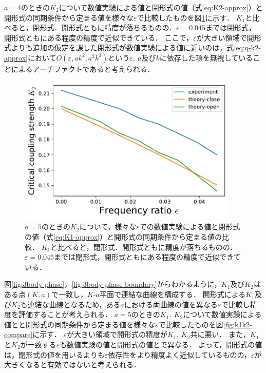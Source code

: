 \documentclass[../main]{subfiles}
\begin{document}
$a=4$のときの$K_2$について数値実験による値と閉形式の値（式\eqref{eq:K2-approx}）と開形式の同期条件から定まる値を様々な$\varepsilon$で比較したものを図\ref{fig:k2-compare}に示す．
$K_1$と比べると，閉形式．開形式ともに精度が落ちるものの．$\varepsilon=0.045$までは閉形式，開形式ともにある程度の精度で近似できている．
ここで，$\varepsilon$が大きい領域で開形式よりも追加の仮定を課した閉形式が数値実験による値に近いのは，式\eqref{eq:q-k2-approx}において$O(\varepsilon,ak^2,a^2k^3)$という$\varepsilon,\ a$及び$k$に依存した項を無視していることによるアーチファクトであると考えられる．

\begin{figure}[tbp]
\centering
\includegraphics[width=105mm]{./images/k2-compare.pdf}
\centering
\caption{$a=5$のときの$K_2$について，様々な$\varepsilon$での数値実験による値と閉形式の値（式\eqref{eq:K1-approx}）と開形式の同期条件から定まる値の比較．
$K_1$と比べると，閉形式．開形式ともに精度が落ちるものの．$\varepsilon=0.045$までは閉形式，開形式ともにある程度の精度で近似できている．}
\label{fig:k2-compare}
\end{figure}

図\ref{fig:3body-phase}，\ref{fig:3body-phase-boundary}からわかるように，$K_1$及び$K_2$はある点$(K,a)$で一致し，$K$-$a$平面で連結な曲線を構成する．
開形式による$K_1$及び$K_2$も連結な曲線となるため，ある$a$における両曲線の値を異なる$\varepsilon$で比較し精度を評価することが考えられる．
$a=5$のときの$K_1,\ K_2$について数値実験による値とと開形式の同期条件から定まる値を様々な$\varepsilon$で比較したものを図\ref{fig:k1k2-compare}に示す．
$\varepsilon$が大きい領域で開形式の精度が$K_1,\ K_2$共に悪い．
また，$K_1$と$K_2$が一致する$\varepsilon$も数値実験の値と開形式の値とで異なる．
よって，開形式の値は，閉形式の値を用いるよりも$\varepsilon$依存性をより精度よく近似しているものの，$\varepsilon$が大きくなると有効ではないと考えられる．
\end{document}
